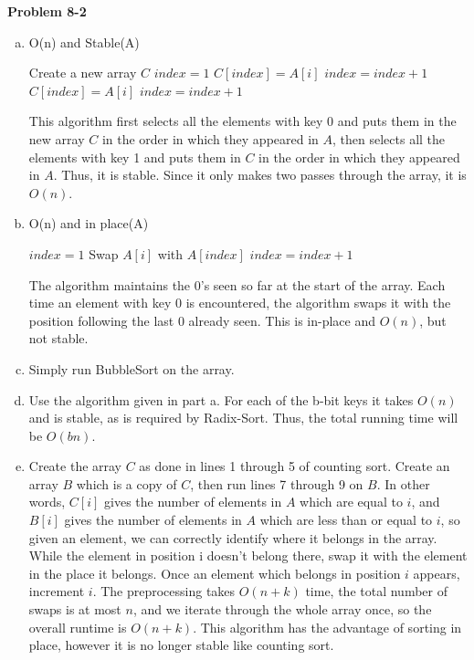 \documentclass{article}
\begin{document}
\noindent\textbf{Problem 8-2}\\

\begin{enumerate}[a.]
\item
\begin{algorithm}
\caption{O(n) and Stable(A)}
\begin{algorithmic}
\State Create a new array $C$
\State $index = 1$
		\State $C[index] = A[i]$
		\State $index = index + 1$
	\EndIf
\EndFor
{}
		\State $C[index] = A[i]$
		\State $index = index + 1$
	\EndIf
\EndFor
\end{algorithmic}
\end{algorithm}
This algorithm first selects all the elements with key 0 and puts them in the new array $C$ in the order in which they appeared in $A$, then selects all the elements with key 1 and puts them in $C$ in the order in which they appeared in $A$.  Thus, it is stable.  Since it only makes two passes through the array, it is $O(n)$. \\

\item
\begin{algorithm}
\caption{O(n) and in place(A)}
\begin{algorithmic}
\State $index = 1$
		\State Swap $A[i]$ with $A[index]$
		\State $index = index  + 1$
	\EndIf
\EndFor
\end{algorithmic}
\end{algorithm}
The algorithm maintains the 0's seen so far at the start of the array.  Each time an element with key 0 is encountered, the algorithm swaps it with the position following the last 0 already seen.  This is in-place and $O(n)$, but not stable. \\

\item  Simply run BubbleSort on the array. \\

\item Use the algorithm given in part a. For each of the b-bit keys it takes $O(n)$ and is stable, as is required by Radix-Sort. Thus, the total running time will be $O(bn)$. \\

\item Create the array $C$ as done in lines 1 through 5 of counting sort.  Create an array $B$ which is a copy of $C$, then run lines 7 through 9 on $B$.  In other words, $C[i]$ gives the number of elements in $A$ which are equal to $i$, and $B[i]$ gives the number of elements in $A$ which are less than or equal to $i$, so given an element, we can correctly identify where it belongs in the array.  While the element in position i doesn't belong there, swap it with the element in the place it belongs. Once an element which belongs in position $i$ appears, increment $i$. The preprocessing takes $O(n+k)$ time, the total number of swaps is at most $n$, and we iterate through the whole array once, so the overall runtime is $O(n+k)$. This algorithm has the advantage of sorting in place, however it is no longer stable like counting sort. 
\end{enumerate}
\end{document}
